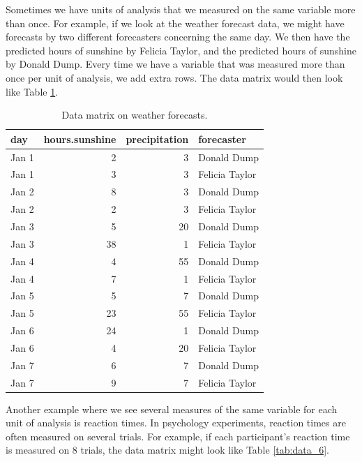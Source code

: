 \documentclass[]{report}\usepackage[]{graphicx}\usepackage[]{color}
\begin{document}
Sometimes we have units of analysis that we measured on the same variable more than once. For example, if we look at the weather forecast data, we might have forecasts by two different forecasters concerning the same day. We then have the predicted hours of sunshine by Felicia Taylor, and the predicted hours of sunshine by Donald Dump. Every time we have a variable that was measured more than once per unit of analysis, we add extra rows. The data matrix would then look like Table \ref{tab:data_5}.


\begin{table}[ht]
\centering
\caption{Data matrix on weather forecasts.} 
\label{tab:data_5}
\begin{tabular}{lrrl}
  \hline
day & hours.sunshine & precipitation & forecaster \\ 
  \hline
Jan 1 & 2 & 3 & Donald Dump \\ 
  Jan 1 & 3 & 3 & Felicia Taylor \\ 
  Jan 2 & 8 & 3 & Donald Dump \\ 
  Jan 2 & 2 & 3 & Felicia Taylor \\ 
  Jan 3 & 5 & 20 & Donald Dump \\ 
  Jan 3 & 38 & 1 & Felicia Taylor \\ 
  Jan 4 & 4 & 55 & Donald Dump \\ 
  Jan 4 & 7 & 1 & Felicia Taylor \\ 
  Jan 5 & 5 & 7 & Donald Dump \\ 
  Jan 5 & 23 & 55 & Felicia Taylor \\ 
  Jan 6 & 24 & 1 & Donald Dump \\ 
  Jan 6 & 4 & 20 & Felicia Taylor \\ 
  Jan 7 & 6 & 7 & Donald Dump \\ 
  Jan 7 & 9 & 7 & Felicia Taylor \\ 
   \hline
\end{tabular}
\end{table}


Another example where we see several measures of the same variable for each unit of analysis is reaction times. In psychology experiments, reaction times are often measured on several trials. For example, if each participant's reaction time is measured on 8 trials, the data matrix might look like Table \ref{tab:data_6}.
\end{document}
